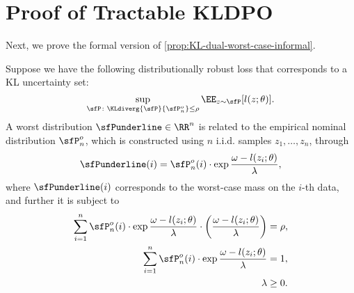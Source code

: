 \section{Proof of Tractable KLDPO}\label{sec:proof-tractable-kldpo}
Next, we prove the formal version of \cref{prop:KL-dual-worst-case-informal}.
\begin{theorem}\label{thm:KL-dual-worst-case-formal}
    Suppose we have the following distributionally robust loss that corresponds to a KL uncertainty set:
    \begin{equation*}
        \sup_{\sfP\colon\KLdiverg{\sfP}{\sfP_n^o}\leq \rho} \EE_{z\sim\sfP} [l(z;\theta)].
    \end{equation*}
    A worst distribution $\sfPunderline\in\RR^n$ is related to the empirical nominal distribution $\sfP^o_n$, which is constructed using $n$ i.i.d. samples $z_1,\dots,z_n$, through
    \begin{equation}
        \sfPunderline(i) = \sfP_n^o(i) \cdot \exp{\frac{\omega - l(z_i;\theta)}{\lambda}},
    \end{equation}
    where $\sfPunderline(i)$ corresponds to the worst-case mass on the $i$-th data, and further it is subject to
    \begin{align}
        \sum_{i=1}^n \sfP_n^o(i)\cdot \exp{\frac{\omega-l(z_i;\theta)}{\lambda}} \cdot \bigg( \frac{\omega-l(z_i;\theta)}{\lambda}\bigg) &= \rho, \label{eq:constr1-of-kl-worst-case-kernel}\\
        \sum_{i=1}^n\sfP_n^o(i)\cdot \exp{\frac{\omega-l(z_i;\theta)}{\lambda}} &= 1, \label{eq:constr2-of-kl-worst-case-kernel}\\
        \lambda &\geq 0\label{eq:constr3-of-kl-worst-case-kernel}.
    \end{align}
\end{theorem}
